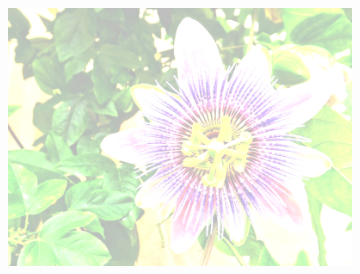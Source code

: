 \documentclass{article}
\begin{document}
\begin{figure}[h]
\begin{subfigure}{.3\textwidth}
  \includegraphics[width=0.97\linewidth]{_Figures/sample_2_brigthness_high.png}
    \caption{}
        \label{fig:brigth_high_2}
\end{subfigure}



\end{figure}
\end{document}
